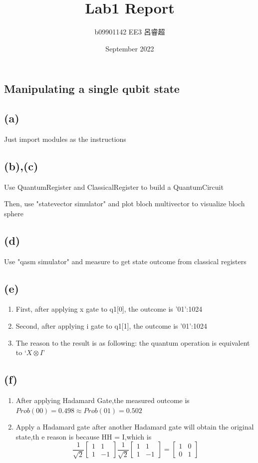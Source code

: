 \documentclass{article}
\title{Lab1 Report}
\author{b09901142 EE3 呂睿超}
\date{September 2022}
\begin{document}
\begin{CJK*}{UTF8}{bsmi}
\maketitle

\section{Manipulating a single qubit state}
\subsection{(a)}\quad Just import modules as the instructions
\subsection{(b),(c)} Use QuantumRegister and ClassicalRegister to build a QuantumCircuit

Then, use "statevector simulator" and plot bloch multivector to visualize bloch sphere 
\subsection{(d)} Use "qasm simulator" and measure to get state outcome from classical registers
\subsection{(e)} 
\begin{enumerate}
\item First, after applying x gate to q1[0], the outcome is {'01':1024}
\item Second, after applying i gate to q1[1], the outcome is {'01':1024}
\item The reason to the result is as following: the quantum operation is equivalent to $‘X\otimes I’$

\end{enumerate}

\subsection{(f)}
\begin{enumerate}
    \item After applying Hadamard Gate,the measured outcome is 
    $Prob(00) = 0.498 \approx Prob(01) = 0.502$
    \item Apply a Hadamard gate after another Hadamard gate will obtain the original state,th e reason is because HH = I,which is 
    \[
    \frac{1}{\sqrt{2}}
    \begin{bmatrix}
    1 & 1 \\
    1 & -1  
    \end{bmatrix}
   \frac{1}{\sqrt{2}}
    \begin{bmatrix}
    1 & 1 \\
    1 & -1  
    \end{bmatrix}
     = 
     \begin{bmatrix}
    1 & 0 \\
    0 & 1  
    \end{bmatrix}
    \]
\end{enumerate}


\end{CJK*}
\end{document}

